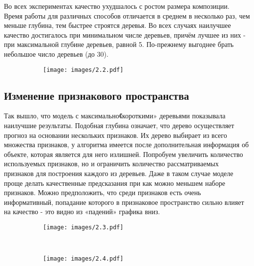 \documentclass[a4paper,14pt]{article}
\begin{document}
Во всех экспериментах качество ухудшалось с ростом размера композиции. Время работы для различных способов отличается в среднем в несколько раз, чем меньше глубина, тем быстрее строятся деревья. Во всех случаях наилучшее качество достигалось при минимальном числе деревьев, причём лучшее из них - при максимальной глубине деревьев, равной 5. По-прежнему выгоднее брать небольшое число деревьев (до 30).
\newpage

\begin{figure}[h!]
                \centering
                \begin{subfigure}[b]{1.0\textwidth}
                    \texttt{[image: images/2.2.pdf]}
                \end{subfigure}
            \end{figure}

\subsection{Изменение признакового пространства}
Так вышло, что модель с максимально《короткими» деревьями показывала наилучшие результаты. Подобная глубина означает, что дерево осуществляет прогноз на основании нескольких признаков. Их дерево выбирает из всего множества признаков, у алгоритма имеется после дополнительная информация об объекте, которая является для него излишней. Попробуем увеличить количество используемых признаков, но и ограничить количество рассматриваемых признаков для построения каждого из деревьев.
Даже в таком случае моделе проще делать качественные предсказания при как можно меньшем наборе признаков. Можно предположить, что среди признаков есть очень информативный, попадание которого в признаковое пространство сильно влияет на качество - это видно из «падений» графика вниз.

\begin{figure}[h!]
                \centering
                \begin{subfigure}[b]{1.0\textwidth}
                    \texttt{[image: images/2.3.pdf]}
                \end{subfigure}
            \end{figure} \\

\begin{figure}[h!]
                \centering
                \begin{subfigure}[b]{1.0\textwidth}
                    \texttt{[image: images/2.4.pdf]}
                \end{subfigure}
            \end{figure} \\
\end{document}
